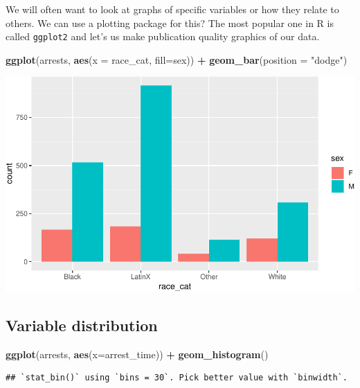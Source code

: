 \documentclass[]{book}
\newenvironment{Shaded}{\begin{snugshade}}{\end{snugshade}}
\newcommand{\DataTypeTok}[1]{\textcolor[rgb]{0.13,0.29,0.53}{#1}}
\newcommand{\KeywordTok}[1]{\textcolor[rgb]{0.13,0.29,0.53}{\textbf{#1}}}
\newcommand{\NormalTok}[1]{#1}
\newcommand{\OperatorTok}[1]{\textcolor[rgb]{0.81,0.36,0.00}{\textbf{#1}}}
\newcommand{\StringTok}[1]{\textcolor[rgb]{0.31,0.60,0.02}{#1}}
\begin{document}
We will often want to look at graphs of specific variables or how they relate to others. We can use a plotting package for this? The most popular one in R is called \texttt{ggplot2} and let's us make publication quality graphics of our data.

\begin{Shaded}
\begin{Highlighting}[]
\KeywordTok{ggplot}\NormalTok{(arrests, }\KeywordTok{aes}\NormalTok{(}\DataTypeTok{x =}\NormalTok{ race_cat, }\DataTypeTok{fill=}\NormalTok{sex)) }\OperatorTok{+}
\StringTok{  }\KeywordTok{geom_bar}\NormalTok{(}\DataTypeTok{position =} \StringTok{"dodge"}\NormalTok{)}
\end{Highlighting}
\end{Shaded}

\begin{center}\includegraphics[width=\textwidth]{afam-188r_files/figure-latex/unnamed-chunk-9-1} \end{center}

\hypertarget{variable-distribution}{%
\subsection{Variable distribution}\label{variable-distribution}}

\begin{Shaded}
\begin{Highlighting}[]
\KeywordTok{ggplot}\NormalTok{(arrests, }\KeywordTok{aes}\NormalTok{(}\DataTypeTok{x=}\NormalTok{arrest_time)) }\OperatorTok{+}\StringTok{ }\KeywordTok{geom_histogram}\NormalTok{()}
\end{Highlighting}
\end{Shaded}

\begin{verbatim}
## `stat_bin()` using `bins = 30`. Pick better value with `binwidth`.
\end{verbatim}
\end{document}
